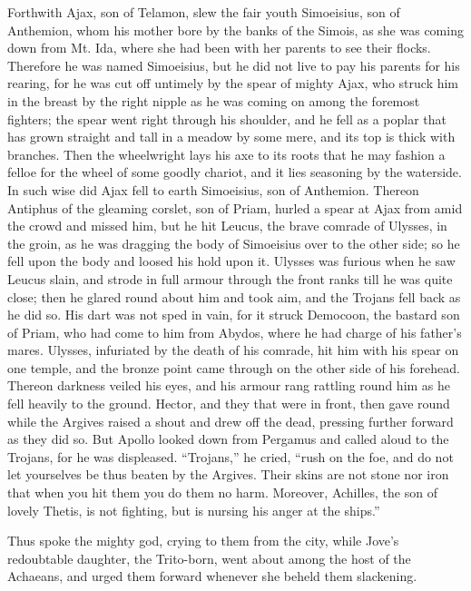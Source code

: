 Forthwith Ajax, son of Telamon, slew the fair youth Simoeisius, son of
Anthemion, whom his mother bore by the banks of the Simois, as she was
coming down from Mt. Ida, where she had been with her parents to see their
flocks. Therefore he was named Simoeisius, but he did not live to pay his
parents for his rearing, for he was cut off untimely by the spear of
mighty Ajax, who struck him in the breast by the right nipple as he was
coming on among the foremost fighters; the spear went right through his
shoulder, and he fell as a poplar that has grown straight and tall in a
meadow by some mere, and its top is thick with branches. Then the
wheelwright lays his axe to its roots that he may fashion a felloe for the
wheel of some goodly chariot, and it lies seasoning by the waterside. In
such wise did Ajax fell to earth Simoeisius, son of Anthemion. Thereon
Antiphus of the gleaming corslet, son of Priam, hurled a spear at Ajax
from amid the crowd and missed him, but he hit Leucus, the brave comrade
of Ulysses, in the groin, as he was dragging the body of Simoeisius over
to the other side; so he fell upon the body and loosed his hold upon it.
Ulysses was furious when he saw Leucus slain, and strode in full armour
through the front ranks till he was quite close; then he glared round
about him and took aim, and the Trojans fell back as he did so. His dart
was not sped in vain, for it struck Democoon, the bastard son of Priam,
who had come to him from Abydos, where he had charge of his father’s
mares. Ulysses, infuriated by the death of his comrade, hit him with his
spear on one temple, and the bronze point came through on the other side
of his forehead. Thereon darkness veiled his eyes, and his armour rang
rattling round him as he fell heavily to the ground. Hector, and they that
were in front, then gave round while the Argives raised a shout and drew
off the dead, pressing further forward as they did so. But Apollo looked
down from Pergamus and called aloud to the Trojans, for he was displeased.
“Trojans,” he cried, “rush on the foe, and do not let yourselves be thus
beaten by the Argives. Their skins are not stone nor iron that when you hit
them you do them no harm. Moreover, Achilles, the son of lovely Thetis, is
not fighting, but is nursing his anger at the ships.”

Thus spoke the mighty god, crying to them from the city, while Jove’s
redoubtable daughter, the Trito-born, went about among the host of the
Achaeans, and urged them forward whenever she beheld them slackening.

